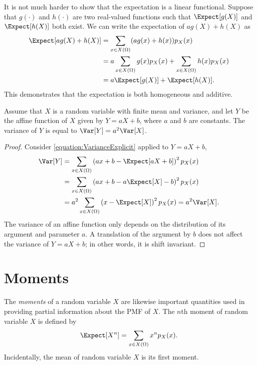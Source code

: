 It is not much harder to show that the expectation is a linear functional.
Suppose that $g(\cdot)$ and $h(\cdot)$ are two real-valued functions such that $\Expect [g(X)]$ and $\Expect [h(X)]$ both exist.
We can write the expectation of $a g(X) + h(X)$ as
\begin{equation*}
\begin{split}
\Expect [ a g(X) + h(X) ] &= \sum_{x \in X(\Omega)} (a g(x) + h(x)) p_X(x) \\
&= a \sum_{x \in X(\Omega)} g(x) p_X(x) + \sum_{x \in X(\Omega)} h(x) p_X(x) \\
&= a \Expect [g(X)] + \Expect [h(X)] .
\end{split}
\end{equation*}
This demonstrates that the expectation is both homogeneous and additive.

\begin{proposition}
Assume that $X$ is a random variable with finite mean and variance, and let $Y$ be the affine function of $X$ given by $Y = aX + b$, where $a$ and $b$ are constants.
The variance of $Y$ is equal to $\Var [Y] = a^2 \Var [X]$.
\end{proposition}
\begin{proof}
Consider \eqref{equation:VarianceExplicit} applied to $Y = aX + b$,
\begin{equation*}
\begin{split}
\Var [Y]
&= \sum_{x \in X(\Omega)} \left( ax + b - \Expect [aX + b] \right)^2 p_X(x) \\
&= \sum_{x \in X(\Omega)} \left( ax + b - a \Expect [X] - b \right)^2 p_X(x) \\
&= a^2 \sum_{x \in X(\Omega)} \left( x - \Expect [X] \right)^2 p_X(x)
= a^2 \Var [X] .
\end{split}
\end{equation*}
The variance of an affine function only depends on the distribution of its argument and parameter $a$.
A translation of the argument by $b$ does not affect the variance of $Y = aX + b$;
in other words, it is shift invariant.
\end{proof}


\section{Moments}

The \emph{moments} of a random variable $X$ are likewise important quantities used in providing partial information about the PMF of $X$. 
The $n$th moment of random variable $X$ is defined by
\begin{equation} \label{equation:DiscreteMoments}
\Expect [X^n] = \sum_{x \in X(\Omega)} x^n p_X (x) .
\end{equation}
Incidentally, the mean of random variable $X$ is its first moment.

